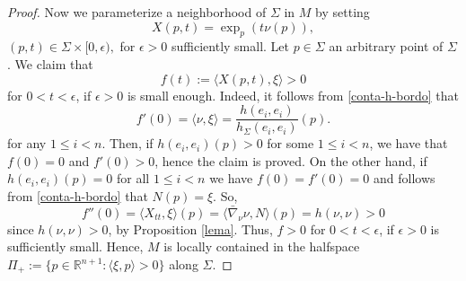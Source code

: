 \documentclass[10pt,a4paper]{amsart}
\begin{document}
\begin{proof}
Now we parameterize a neighborhood of $\Sigma$ in $M$ by setting  
\[
X(p,t)=\exp_{p}\left(t\nu(p)\right),
\]
$(p,t)\in \Sigma\times [0,\epsilon),$ for $\epsilon>0$ sufficiently small. Let $p\in \Sigma$ an arbitrary point of $\Sigma$. We claim that
 \[
 f(t):=\langle X(p,t), \xi \rangle >0
 \]
  for  $0<t<\epsilon$, if $\epsilon>0$ is small enough. Indeed, it follows from \eqref{conta-h-bordo} that 
  \[
  f'(0)=\langle  \nu, \xi\rangle= \frac{h(e_i, e_i)}{h_\Sigma(e_i, e_i)}(p).
  \] 
  for any $1\leq i<n$. Then, if $h(e_i,e_i)(p)>0$ for some $1\leq i<n$, we have that $f(0)=0$ and $f'(0)>0$, hence the claim is proved. On the other hand, if $h(e_i,e_i)(p)= 0$ for all $1\leq i<n$ we have $f(0)=f'(0)=0$ and follows from \eqref{conta-h-bordo} that $N(p)=\xi$. So,
  \[
  f''(0)= \langle X_{tt}, \xi \rangle (p)= \langle \bar\nabla_\nu \nu, N \rangle (p)=  h(\nu, \nu) >0
  \]
since $h(\nu, \nu) >0$,  by Proposition \ref{lema}. Thus, $f>0$ for  $0<t<\epsilon$, if $\epsilon>0$ is sufficiently small.
Hence, $M$ is locally contained in the halfspace $\Pi_+:=\{ p\in\mathbb{R}^{n+1} : \langle \xi, p\rangle >0\}$ along $\Sigma$.
\end{proof}
\end{document}
